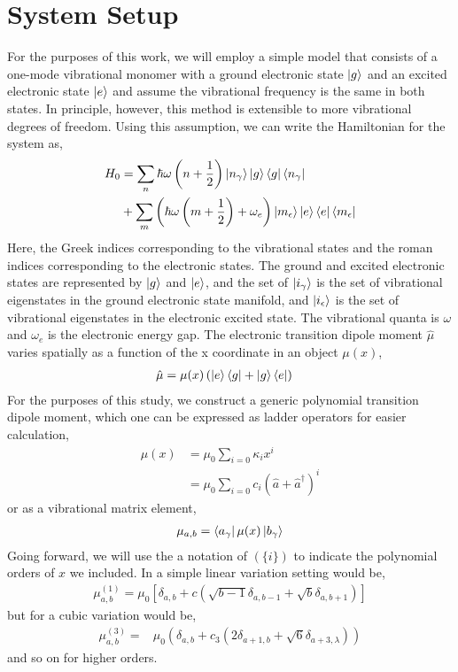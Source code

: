 \section{System Setup}
For the purposes of this work, we will employ a simple model that consists of a one-mode vibrational monomer with a ground electronic state $\ket{g}$ and an excited electronic state $\ket{e}$ and assume the vibrational frequency is the same in both states.  In principle, however, this method is extensible to more vibrational degrees of freedom.  Using this assumption, we can write the Hamiltonian for the system as,
\begin{align}
	H_0 &=  \sum_n \hbar \omega \left(n + \frac{1}{2} \right)  \ket{n_{\gamma}}\ket{g}\bra{g} \bra{n_{\gamma}} \\
   &+ \sum_m \left(  \hbar \omega  \left(m + \frac{1}{2} \right) + \omega_e \right)  \ket{m_{\epsilon}} \ket{e}\bra{e} \bra{m_{\epsilon}}
\end{align}
Here, the Greek indices corresponding to the vibrational states and the roman indices corresponding to the electronic states.  The ground and excited electronic states are represented by $\ket{g}$ and $\ket{e}$, and the set of $\ket{i_{\gamma}}$ is the set of vibrational eigenstates in the ground electronic state manifold, and $\ket{i_{\epsilon}}$ is the set of vibrational eigenstates in the electronic excited state.  The vibrational quanta is $\omega$ and $\omega_e$ is the electronic energy gap.  The electronic transition  dipole moment $\hat{\mu}$ varies spatially as a function of the x coordinate in an object $\mu(x)$,
\begin{align}
	\hat{\mu} &= \mu (x)  \left( \ket{e}\bra{g} + \ket{g} \bra{e} \right)
\end{align}
For the purposes of this study, we construct a generic polynomial transition dipole moment, which one can be expressed as ladder operators for easier calculation,
\begin{align}
	\mu(x) &= \mu_0 \sum_{i=0} \kappa_i x^i \\
	&= \mu_0 \sum_{i=0} c_i \left( \hat{a} + \hat{a}^{\dagger}\right)^i
\end{align}
or as a vibrational matrix element,
\begin{align}
	\mu_{a,b} = \bra{a_{\gamma}} \mu(x) \ket{b_{\gamma}}
\end{align}
Going forward, we will use the a notation of $(\{i\})$ to indicate the polynomial orders of $x$ we included.  In a simple linear variation setting would be,
\begin{align}
	\mu^{(1)}_{a,b} = \mu_0 \left[ \delta_{a,b} + c \left( \sqrt{b-1}\delta_{a,b-1} + \sqrt{b}\delta_{a,b+1}\right) \right]
\end{align}
but for a cubic variation would be,
\begin{align*}
	\mu^{(3)}_{a,b} =& \mu_0 \left( \delta_{a,b}  + c_3   \left(2\delta_{a + 1,b}  +\sqrt{6}\delta_{a + 3,\lambda} \right)\right)
\end{align*}
and so on for higher orders.

